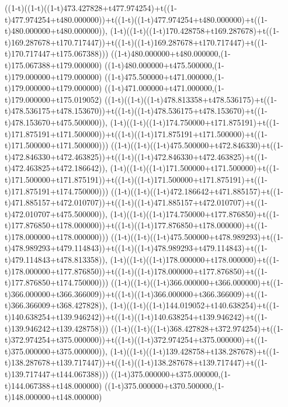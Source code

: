 ((1-t)((1-t)((1-t)473.427828+t477.974254)+t((1-t)477.974254+t480.000000))+t((1-t)((1-t)477.974254+t480.000000)+t((1-t)480.000000+t480.000000)),                                     (1-t)((1-t)((1-t)170.428758+t169.287678)+t((1-t)169.287678+t170.717447))+t((1-t)((1-t)169.287678+t170.717447)+t((1-t)170.717447+t175.067388)))
((1-t)480.000000+t480.000000,(1-t)175.067388+t179.000000)
((1-t)480.000000+t475.500000,(1-t)179.000000+t179.000000)
((1-t)475.500000+t471.000000,(1-t)179.000000+t179.000000)
((1-t)471.000000+t471.000000,(1-t)179.000000+t175.019052)
((1-t)((1-t)((1-t)478.813358+t478.536175)+t((1-t)478.536175+t478.153670))+t((1-t)((1-t)478.536175+t478.153670)+t((1-t)478.153670+t475.500000)),                                     (1-t)((1-t)((1-t)174.750000+t171.875191)+t((1-t)171.875191+t171.500000))+t((1-t)((1-t)171.875191+t171.500000)+t((1-t)171.500000+t171.500000)))
((1-t)((1-t)((1-t)475.500000+t472.846330)+t((1-t)472.846330+t472.463825))+t((1-t)((1-t)472.846330+t472.463825)+t((1-t)472.463825+t472.186642)),                                     (1-t)((1-t)((1-t)171.500000+t171.500000)+t((1-t)171.500000+t171.875191))+t((1-t)((1-t)171.500000+t171.875191)+t((1-t)171.875191+t174.750000)))
((1-t)((1-t)((1-t)472.186642+t471.885157)+t((1-t)471.885157+t472.010707))+t((1-t)((1-t)471.885157+t472.010707)+t((1-t)472.010707+t475.500000)),                                     (1-t)((1-t)((1-t)174.750000+t177.876850)+t((1-t)177.876850+t178.000000))+t((1-t)((1-t)177.876850+t178.000000)+t((1-t)178.000000+t178.000000)))
((1-t)((1-t)((1-t)475.500000+t478.989293)+t((1-t)478.989293+t479.114843))+t((1-t)((1-t)478.989293+t479.114843)+t((1-t)479.114843+t478.813358)),                                     (1-t)((1-t)((1-t)178.000000+t178.000000)+t((1-t)178.000000+t177.876850))+t((1-t)((1-t)178.000000+t177.876850)+t((1-t)177.876850+t174.750000)))
((1-t)((1-t)((1-t)366.000000+t366.000000)+t((1-t)366.000000+t366.366009))+t((1-t)((1-t)366.000000+t366.366009)+t((1-t)366.366009+t368.427828)),                                     (1-t)((1-t)((1-t)144.019052+t140.638254)+t((1-t)140.638254+t139.946242))+t((1-t)((1-t)140.638254+t139.946242)+t((1-t)139.946242+t139.428758)))
((1-t)((1-t)((1-t)368.427828+t372.974254)+t((1-t)372.974254+t375.000000))+t((1-t)((1-t)372.974254+t375.000000)+t((1-t)375.000000+t375.000000)),                                     (1-t)((1-t)((1-t)139.428758+t138.287678)+t((1-t)138.287678+t139.717447))+t((1-t)((1-t)138.287678+t139.717447)+t((1-t)139.717447+t144.067388)))
((1-t)375.000000+t375.000000,(1-t)144.067388+t148.000000)
((1-t)375.000000+t370.500000,(1-t)148.000000+t148.000000)

